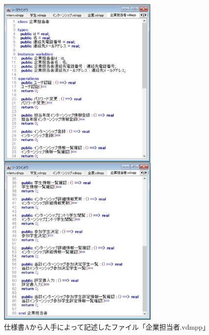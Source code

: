 \begin{figure}[tp]
    \begin{center}
    \includegraphics[width=300]{image/speA_vdm5.PNG}
    \caption{仕様書Aから人手によって記述したファイル「企業担当者.vdmpp」}
    \label{fig:speA_vdm5}
    \end{center}
\end{figure}

